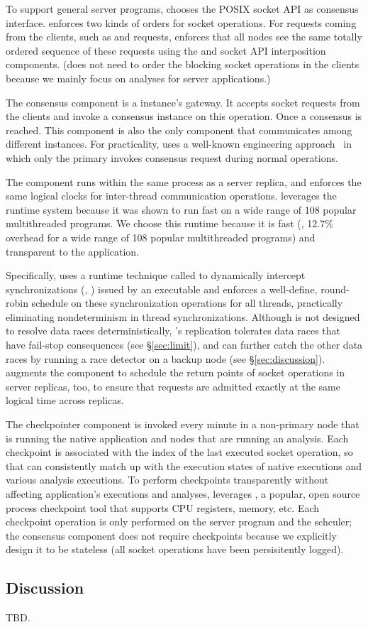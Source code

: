 To support general server programs, \xxx chooses the POSIX socket API as
consensus interface. \xxx enforces two kinds of orders for socket
operations.  For requests coming from the clients, such as \connect and
\send requests, \xxx enforces that all nodes see the same totally ordered
sequence of these requests using the \paxos and socket API interposition
components.  (\xxx does not need to order the blocking socket operations
in the clients because we mainly focus on analyses for server applications.)


The \paxos consensus component is a \xxx instance's gateway.  It accepts socket
requests from the clients and invoke a \paxos consensus instance on this 
operation. Once a consensus is reached. This component is also the only \xxx 
component that communicates among different \xxx instances. For practicality, 
\xxx uses a well-known \paxos engineering approach~\cite{paxos:practical} in 
which only the primary invokes consensus request during normal operations.

The \dmt component runs within the same process as a server replica, and
enforces the same logical clocks for inter-thread communication
operations. \xxx leverages the \parrot~\cite{parrot:sosp13} \dmt runtime
system because it was shown to run fast on a wide range of 108 popular
multithreaded programs. We choose this \dmt runtime because it is fast (\ie, 
12.7\% overhead for a wide range of 108 popular multithreaded programs) and 
transparent to the application.

Specifically, \parrot uses a runtime technique called \ldpreload to dynamically 
intercept \pthread synchronizations (\eg, \mutexlock) issued by an executable 
and enforces a well-define, round-robin schedule on these synchronization 
operations for all threads, practically eliminating nondeterminism in thread
synchronizations. Although \parrot is not designed to resolve data races
deterministically, \xxx's replication tolerates data races that have
fail-stop consequences (see \S\ref{sec:limit}), and can further catch the
other data races by running a race detector on a backup node (see
\S\ref{sec:discussion}).  \xxx augments the \dmt component to schedule the
return points of socket operations in server replicas, too, to ensure that
requests are admitted exactly at the same logical time across replicas.

The checkpointer component is invoked every minute in a non-primary node that 
is running the native application and nodes that are running an analysis. Each 
checkpoint is associated with the index of the last executed socket operation, 
so that \xxx can consistently match up with the execution states of native 
executions and various analysis executions. To perform checkpoints 
transparently without affecting application's executions and analyses, \xxx 
leverages \criu, a popular, open source process checkpoint tool that supports 
CPU registers, memory, etc. Each checkpoint operation is only performed on the 
server program and the \dmt schculer; the \paxos consensus component does not 
require checkpoints because we explicitly design it to be stateless (all socket 
operations have been persisitently logged).


\subsection{Discussion} \label{sec:discuss}

TBD.